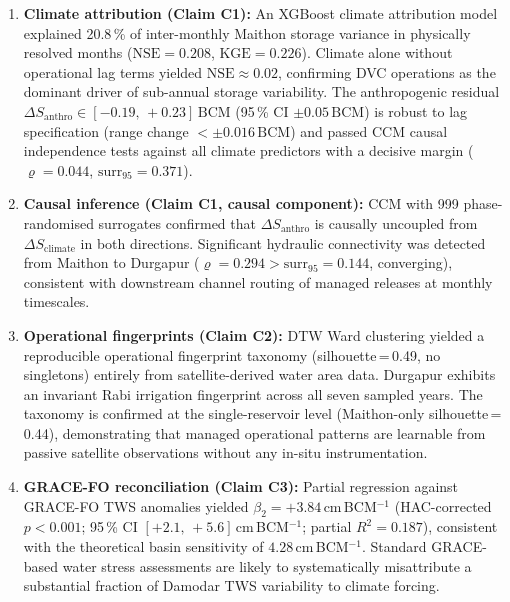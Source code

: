 \documentclass[preprint,12pt,authoryear]{elsarticle}
\newcommand{\dSclim}{\Delta S_{\mathrm{climate}}}
\newcommand{\dSanthro}{\Delta S_{\mathrm{anthro}}}
\newcommand{\BCM}{\,\mathrm{BCM}}
\newcommand{\NSE}{\mathrm{NSE}}
\newcommand{\KGE}{\mathrm{KGE}}
\begin{document}
\begin{enumerate}

  \item \textbf{Climate attribution (Claim C1):} An XGBoost climate attribution
    model explained 20.8\,\% of inter-monthly Maithon storage variance in
    physically resolved months ($\NSE = 0.208$, $\KGE = 0.226$). Climate alone
    without operational lag terms yielded $\NSE \approx 0.02$, confirming DVC
    operations as the dominant driver of sub-annual storage variability.
    The anthropogenic residual $\dSanthro \in [-0.19,\,+0.23]\BCM$
    (95\,\% CI $\pm 0.05\BCM$) is robust to lag specification (range change
    $< \pm 0.016\BCM$) and passed CCM causal independence tests against all
    climate predictors with a decisive margin ($\varrho = 0.044$,
    $\text{surr}_{95} = 0.371$).

  \item \textbf{Causal inference (Claim C1, causal component):} CCM with 999
    phase-randomised surrogates confirmed that $\dSanthro$ is causally
    uncoupled from $\dSclim$ in both directions. Significant hydraulic
    connectivity was detected from Maithon to Durgapur
    ($\varrho = 0.294 > \text{surr}_{95} = 0.144$, converging), consistent
    with downstream channel routing of managed releases at monthly timescales.

  \item \textbf{Operational fingerprints (Claim C2):} DTW Ward clustering
    yielded a reproducible operational fingerprint taxonomy
    (silhouette\,=\,0.49, no singletons) entirely from satellite-derived
    water area data. Durgapur exhibits an invariant Rabi irrigation fingerprint
    across all seven sampled years. The taxonomy is confirmed at the
    single-reservoir level (Maithon-only silhouette\,=\,0.44), demonstrating
    that managed operational patterns are learnable from passive satellite
    observations without any in-situ instrumentation.

  \item \textbf{GRACE-FO reconciliation (Claim C3):} Partial regression
    against GRACE-FO TWS anomalies yielded $\beta_2 = +3.84$\,cm\,BCM$^{-1}$
    (HAC-corrected $p < 0.001$; 95\,\% CI $[+2.1,\,+5.6]$\,cm\,BCM$^{-1}$;
    partial $R^2 = 0.187$), consistent with the theoretical basin sensitivity
    of $4.28$\,cm\,BCM$^{-1}$. Standard GRACE-based water stress assessments
    are likely to systematically misattribute a substantial fraction of
    Damodar TWS variability to climate forcing.

\end{enumerate}
\end{document}
